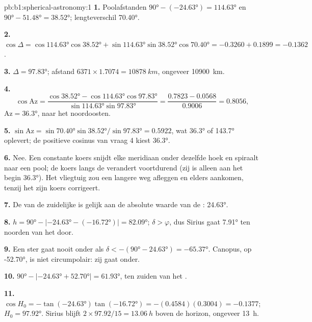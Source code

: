 \begin{solution}{pb:b1:spherical-astronomy:1}
\textbf{1.} Poolafstanden $\ang{90} - (\ang{-24.63}) = \ang{114.63}$ en
$\ang{90} - \ang{51.48} = \ang{38.52}$; lengteverschil \ang{70.40}.

\textbf{2.} $\cos\Delta = \cos\ang{114.63}\cos\ang{38.52} +
\sin\ang{114.63}\sin\ang{38.52}\cos\ang{70.40} = -0.3260 + 0.1899 =
-0.1362$.

\textbf{3.} $\Delta = \ang{97.83}$; afstand $6371\times1.7074 =
\qty{10878}{km}$, ongeveer \qty{10900}{km}.

\textbf{4.}
\[
  \cos\mathrm{Az} = \frac{\cos\ang{38.52} - \cos\ang{114.63}\cos\ang{97.83}}
  {\sin\ang{114.63}\sin\ang{97.83}} = \frac{0.7823 - 0.0568}{0.9006} = 0.8056 ,
\]
$\mathrm{Az} = \ang{36.3}$, naar het noordoosten.

\textbf{5.} $\sin\mathrm{Az} = \sin\ang{70.40}\sin\ang{38.52}/\sin\ang{97.83}
= 0.5922$, wat \ang{36.3} of \ang{143.7} oplevert; de positieve cosinus van
vraag 4 kiest \ang{36.3}.

\textbf{6.} Nee. Een constante koers snijdt elke meridiaan onder dezelfde hoek
en spiraalt naar een pool; de koers langs de  verandert voortdurend
(zij is alleen aan het begin \ang{36.3}). Het vliegtuig zou een langere weg
afleggen en elders aankomen, tenzij het zijn koers corrigeert.

\textbf{7.} De  van de zuidelijke  is gelijk aan de absolute
waarde van de : \ang{24.63}.

\textbf{8.} $h = \ang{90} - |\ang{-24.63} - (\ang{-16.72})| = \ang{82.09}$;
$\delta > \varphi$, dus Sirius gaat \ang{7.91} ten noorden van het  door.

\textbf{9.} Een ster gaat nooit onder als $\delta < -(\ang{90} - \ang{24.63}) =
\ang{-65.37}$. Canopus, op \ang{-52.70}, is niet circumpolair: zij gaat onder.

\textbf{10.} $\ang{90} - |\ang{-24.63} + \ang{52.70}| = \ang{61.93}$, ten zuiden
van het .

\textbf{11.} $\cos H_0 = -\tan(\ang{-24.63})\tan(\ang{-16.72}) =
-(0.4584)(0.3004) = -0.1377$; $H_0 = \ang{97.92}$. Sirius blijft
$2\times97.92/15 = \qty{13.06}{h}$  boven de horizon, ongeveer
\qty{13}{h}.


\end{solution}
